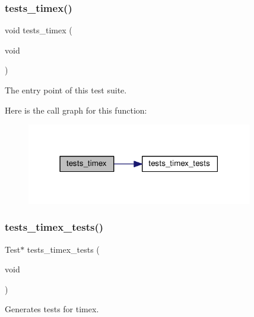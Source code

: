 \subsubsection{\texorpdfstring{tests\+\_\+timex()}{tests\_timex()}}
{\footnotesize\ttfamily void tests\+\_\+timex (\begin{DoxyParamCaption}\item[{void}]{ }\end{DoxyParamCaption})}



The entry point of this test suite. 

Here is the call graph for this function\+:
\nopagebreak
\begin{figure}[H]
\begin{center}
\leavevmode
\includegraphics[width=279pt]{group__unittests_gad66683ae3365683aba4d469e07ce6799_cgraph}
\end{center}
\end{figure}
\mbox{\label{group__unittests_ga8e6c61c50f2b2580f16effebba8a7e83}} 
\subsubsection{\texorpdfstring{tests\+\_\+timex\+\_\+tests()}{tests\_timex\_tests()}}
{\footnotesize\ttfamily Test$\ast$ tests\+\_\+timex\+\_\+tests (\begin{DoxyParamCaption}\item[{void}]{ }\end{DoxyParamCaption})}



Generates tests for timex. 

